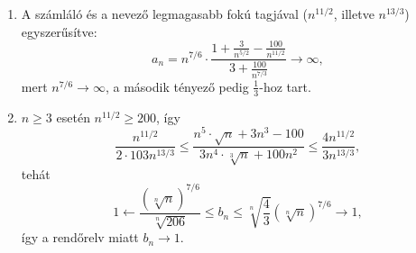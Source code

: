 \documentclass[11pt]{scrartcl}
\begin{document}
\begin{enumerate}
	\item A számláló és a nevező legmagasabb fokú tagjával
	      ($n^{11/2}$, illetve $n^{13/3}$) egyszerűsítve:
	      \[
		      a_n
		      = n^{7/6} \cdot
		      \frac{1 + \frac{3}{n^{5/2}} - \frac{100}{n^{11/2}}}{3 + \frac{100}{n^{7/3}}}
		      \to \infty,
	      \]
	      mert $n^{7/6} \to \infty$, a második tényező pedig $\frac{1}{3}$-hoz
	      tart.

	\item $n \ge 3$ esetén $n^{11/2} \ge 200$, így
	      \[
		      \frac{n^{11/2}}{2 \cdot 103 n^{13/3}}
		      \le \frac{n^5 \cdot \sqrt{n} + 3n^3 - 100}{3n^4 \cdot \sqrt[3]{n} + 100n^2}
		      \le \frac{4 n^{11/2}}{3 n^{13/3}},
	      \]
	      tehát
	      \[
		      1
		      \leftarrow \frac{\left(\sqrt[n]{n}\right)^{7/6}}{\sqrt[n]{206}}
		      \le b_n
		      \le \sqrt[n]{\frac{4}{3}} \left(\sqrt[n]{n}\right)^{7/6}
		      \to 1,
	      \]
	      így a rendőrelv miatt $b_n \to 1$.
\end{enumerate}
\end{document}
